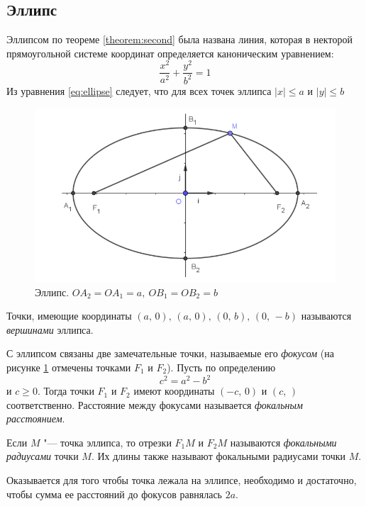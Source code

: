 \subsection*{Эллипс}
Эллипсом по теореме \ref{theorem:second} была названа линия, которая в некторой прямоугольной системе координат определяется каноническим уравнением:
\begin{equation}
  \label{eq:ellipse}
  \frac{x^2}{a^2} + \frac{y^2}{b^2} = 1
\end{equation}
Из уравнения \ref{eq:ellipse} следует, что для всех точек эллипса $\mathopen|x\mathclose| \leq a$ и $\mathopen|y\mathclose| \leq b$
\begin{figure}[H]
  \centering
  \includegraphics[width = \textwidth]{images/second_ellipse.png}
  \caption{Эллипс. $OA_2 = OA_1 = a, ~ OB_1 = OB_2 = b$}
  \label{fig:ellipse} 
\end{figure}

Точки, имеющие координаты $(a,\, 0), \, (a,\, 0), \, (0,\, b), \, (0,\, -b)$ называются \textit{вершинами} эллипса.

С эллипсом связаны две замечательные точки, называемые его \textit{фокусом} (на рисунке \ref{fig:ellipse} отмечены точками $F_1$ и $F_2$). Пусть по определению 
$$
  c^2 = a^2 - b^2
$$
и $c \geq 0$. Тогда точки $F_1$ и $F_2$ имеют координаты $(-c,\, 0)$ и $(c, \, )$ соответственно. Расстояние между фокусами называется \textit{фокальным расстоянием}.

Если $M$ "--- точка эллипса, то отрезки $F_1M$ и $F_2M$ называются \textit{фокальными радиусами} точки $M$. Их длины также называют фокальными радиусами точки $M$. 

Оказывается для того чтобы точка лежала на эллипсе, необходимо и достаточно, чтобы сумма ее расстояний до фокусов равнялась $2a$. 

